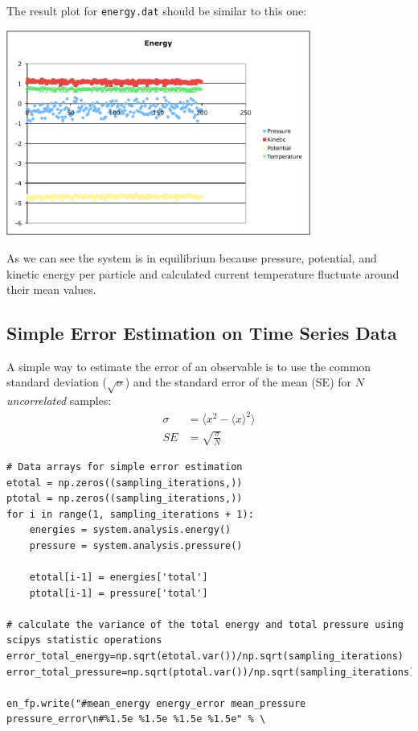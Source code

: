 \documentclass[
paper=a4,                       %
fontsize=11pt,                  %
twoside,                        %
footsepline,                    %
headsepline,                    %
headinclude=false,              %
footinclude=false,              %
pagesize,                       %
]{scrartcl}
\begin{document}
The result plot for \texttt{energy.dat}
should be similar to this one:
\begin{center}
  \includegraphics[width=10cm]{figures/energy}
\end{center}
\noindent As we can see the system is in equilibrium because pressure, potential, and kinetic energy per particle 
and calculated current temperature fluctuate around their mean values.

   
\subsection{Simple Error Estimation on Time Series Data}
A simple way to estimate the error of an observable is to use the common standard
deviation ($\sqrt{\sigma}$) and the standard error of the mean (SE) for $N$
\emph{uncorrelated} samples:
\begin{align}
    \sigma  &= \langle x^2 - \langle x\rangle^2 \rangle \\
    SE      &= \sqrt{\frac{\sigma}{N}}
    \label{eq:variance}
\end{align}

\begin{lstlisting}
# Data arrays for simple error estimation
etotal = np.zeros((sampling_iterations,))
ptotal = np.zeros((sampling_iterations,))
for i in range(1, sampling_iterations + 1):
    energies = system.analysis.energy()
    pressure = system.analysis.pressure()

    etotal[i-1] = energies['total']
    ptotal[i-1] = pressure['total']

# calculate the variance of the total energy and total pressure using scipys statistic operations
error_total_energy=np.sqrt(etotal.var())/np.sqrt(sampling_iterations)
error_total_pressure=np.sqrt(ptotal.var())/np.sqrt(sampling_iterations)

en_fp.write("#mean_energy energy_error mean_pressure pressure_error\n#%1.5e %1.5e %1.5e %1.5e" % \
\end{lstlisting}
\end{document}
